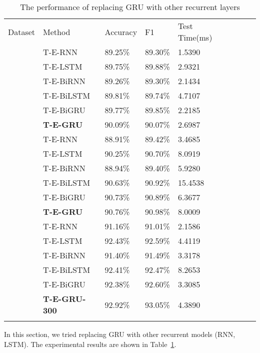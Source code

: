 \begin{table}
	\caption{The performance of replacing GRU with other recurrent layers}
	\label{tab:T-E-OtherRNN}       
	\begin{tabular}{llllllll}
		\hline\noalign{\smallskip}
		Dataset    &Method 		& Accuracy 		&F1		 & Test Time(ms)\\
		\noalign{\smallskip}\hline\noalign{\smallskip}
		\multirow{3}{*}{DMSC\_V2}
		&T-E-RNN			&89.25\%			&89.30\%	      &1.5390\\
		&T-E-LSTM			&89.75\%			&89.88\%	      &2.9321\\
		&T-E-BiRNN          &89.26\%            &89.30\%          &2.1434\\
		&T-E-BiLSTM			&89.81\%			&89.74\%	      &4.7107\\
		&T-E-BiGRU			&89.77\%			&89.85\%	      &2.2185\\
		&\textbf{T-E-GRU}	&90.09\%	        &90.07\%	      &2.6987\\

		\noalign{\smallskip}\hline\noalign{\smallskip}
		\multirow{3}{*}{YF\_DianPing}
		&T-E-RNN			&88.91\%			&89.42\%	    &3.4685\\
		&T-E-LSTM			&90.25\%			&90.70\%	    &8.0919\\
		&T-E-BiRNN          &88.94\%            &89.40\%        &5.9280\\
		&T-E-BiLSTM			&90.63\%			&90.92\%	    &15.4538\\
		&T-E-BiGRU			&90.73\%			&90.89\%	    &6.3677\\
		&\textbf{T-E-GRU}	&90.76\%	        &90.98\%	    &8.0009\\
		\noalign{\smallskip}\hline\noalign{\smallskip}
		\multirow{3}{*}{Online\_shopping}
		&T-E-RNN			&91.16\%	        &91.01\%	    &2.1586\\	
		&T-E-LSTM			&92.43\%	        &92.59\%	    &4.4119\\	
		&T-E-BiRNN          &91.40\%            &91.49\%        &3.3178\\
		&T-E-BiLSTM			&92.41\%			&92.47\%	    &8.2653\\
		&T-E-BiGRU			&92.38\%			&92.60\%	    &3.3085\\
		&\textbf{T-E-GRU-300}&92.92\%	        &93.05\%	    &4.3890\\
		\noalign{\smallskip}\hline\noalign{\smallskip}
	\end{tabular}
\end{table}
In this section, we tried replacing GRU with other recurrent models (RNN, LSTM). The experimental results are shown in Table~\ref{tab:T-E-OtherRNN}.

